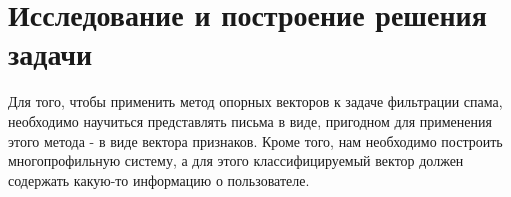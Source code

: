 \newpage
\section{Исследование и построение решения задачи}
\label{research}

Для того, чтобы применить метод опорных векторов к задаче фильтрации спама,
необходимо научиться представлять письма в виде, пригодном для применения
этого метода - в виде вектора признаков.
Кроме того, нам необходимо построить многопрофильную систему, а для этого
классифицируемый вектор должен содержать какую-то информацию о пользователе.

